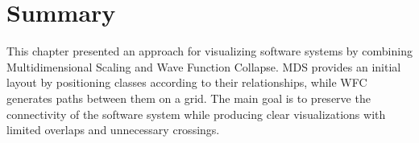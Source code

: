 \documentclass[../../main.tex]{subfiles}
\begin{document}




\section{Summary}

This chapter presented an approach for visualizing software systems by combining Multidimensional Scaling and Wave Function Collapse. MDS provides an initial layout by positioning classes according to their relationships, while WFC generates paths between them on a grid. The main goal is to preserve the connectivity of the software system while producing clear visualizations with limited overlaps and unnecessary crossings.
\end{document}
